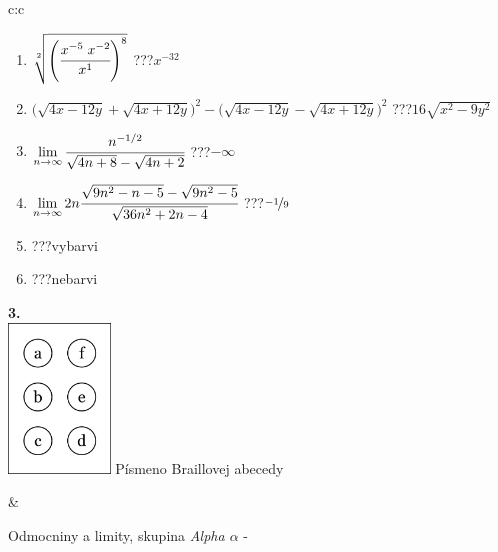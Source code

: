 \documentclass[10pt]{report}
\begin{document}
\begin{tabular}{c:c}
\begin{minipage}[c][104.5mm][t]{0.5\linewidth}
\begin{center}
\begin{minipage}{0.79\linewidth}
\begin{center}
\begin{varwidth}{\linewidth}
\begin{enumerate}
\small
\item $\sqrt[2]{\left(\cfrac{x^{-5}\;x^{-2}}{x^{1}}\right)^{8}}$\quad \dotfill\; ???\;\dotfill \quad $x^{-32}$
\item {\footnotesize{\scriptsize$\big(\sqrt{4x-12y}+\sqrt{4x+12y}\big)^2-\big(\sqrt{4x-12y}-\sqrt{4x+12y}\big)^2$}\quad \dotfill\; ???\;\dotfill \quad $16\sqrt{x^2-9y^2}$}
\item $\lim\limits_{n\to\infty}\cfrac{n^{-1/2}}{\sqrt{4n+8}-\sqrt{4n+2}}$\quad \dotfill\; ???\;\dotfill \quad $-\infty$
\item $\lim\limits_{n\to\infty}2n\cfrac{\sqrt{9n^2-n-5}-\sqrt{9n^2-5}}{\sqrt{36n^2+2n-4}}$\quad \dotfill\; ???\;\dotfill \quad $\nicefrac{-1}{9}$
\item \quad \dotfill\; ???\;\dotfill \quad vybarvi
\item \quad \dotfill\; ???\;\dotfill \quad nebarvi
\end{enumerate}
\end{varwidth}
\end{center}
\end{minipage}
\begin{minipage}{0.20\linewidth}
\begin{center}
{\Huge\bfseries 3.} \\[2mm]
\includegraphics[height=40mm]{../images/braille.png}
{\small Písmeno Braillovej abecedy}
\end{center}
\end{minipage}
\end{center}
\end{minipage}
&
\begin{minipage}[c][104.5mm][t]{0.5\linewidth}
\begin{center}
\vspace{7mm}
{\huge Odmocniny a limity, skupina \textit{Alpha $\alpha$} -}\\[5mm]

\end{center}
\end{minipage}
\end{tabular}
\end{document}
